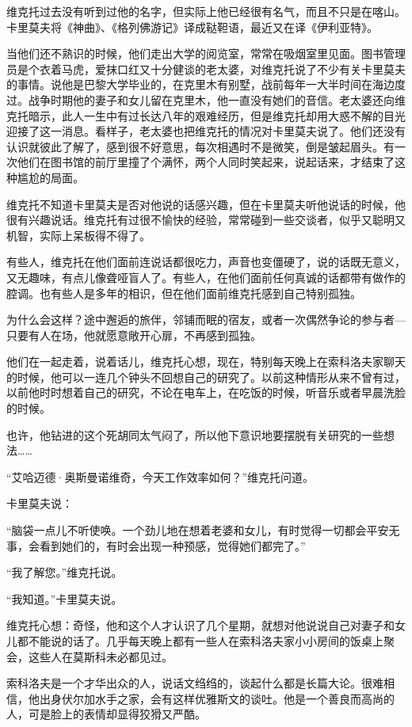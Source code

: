 维克托过去没有听到过他的名字，但实际上他已经很有名气，而且不只是在喀山。卡里莫夫将《神曲》、《格列佛游记》译成鞑靼语，最近又在译《伊利亚特》。

当他们还不熟识的时候，他们走出大学的阅览室，常常在吸烟室里见面。图书管理员是个衣着马虎，爱抹口红又十分健谈的老太婆，对维克托说了不少有关卡里莫夫的事情。说他是巴黎大学毕业的，在克里木有别墅，战前每年一大半时间在海边度过。战争时期他的妻子和女儿留在克里木，他一直没有她们的音信。老太婆还向维克托暗示，此人一生中有过长达八年的艰难经历，但是维克托却用大惑不解的目光迎接了这一消息。看样子，老太婆也把维克托的情况对卡里莫夫说了。他们还没有认识就彼此了解了，感到很不好意思，每次相遇时不是微笑，倒是皱起眉头。有一次他们在图书馆的前厅里撞了个满怀，两个人同时笑起来，说起话来，才结束了这种尴尬的局面。

维克托不知道卡里莫夫是否对他说的话感兴趣，但在卡里莫夫听他说话的时候，他很有兴趣说话。维克托有过很不愉快的经验，常常碰到一些交谈者，似乎又聪明又机智，实际上呆板得不得了。

有些人，维克托在他们面前连说话都很吃力，声音也变僵硬了，说的话既无意义，又无趣味，有点儿像聋哑盲人了。有些人，在他们面前任何真诚的话都带有做作的腔调。也有些人是多年的相识，但在他们面前维克托感到自己特别孤独。

为什么会这样？途中邂逅的旅伴，邻铺而眠的宿友，或者一次偶然争论的参与者—只要有人在场，他就愿意敞开心扉，不再感到孤独。

他们在一起走着，说着话儿，维克托心想，现在，特别每天晚上在索科洛夫家聊天的时候，他可以一连几个钟头不回想自己的研究了。以前这种情形从来不曾有过，以前他时时想着自己的研究，不论在电车上，在吃饭的时候，听音乐或者早晨洗脸的时候。

也许，他钻进的这个死胡同太气闷了，所以他下意识地要摆脱有关研究的一些想法……

“艾哈迈德·奥斯曼诺维奇，今天工作效率如何？”维克托问道。

卡里莫夫说：

“脑袋一点儿不听使唤。一个劲儿地在想着老婆和女儿，有时觉得一切都会平安无事，会看到她们的，有时会出现一种预感，觉得她们都完了。”

“我了解您。”维克托说。

“我知道。”卡里莫夫说。

维克托心想：奇怪，他和这个人才认识了几个星期，就想对他说说自己对妻子和女儿都不能说的话了。几乎每天晚上都有一些人在索科洛夫家小小房间的饭桌上聚会，这些人在莫斯科未必都见过。

索科洛夫是一个才华出众的人，说话文绉绉的，谈起什么都是长篇大论。很难相信，他出身伏尔加水手之家，会有这样优雅斯文的谈吐。他是一个善良而高尚的人，可是脸上的表情却显得狡猾又严酷。

